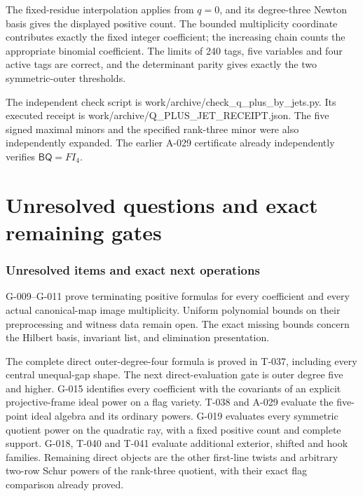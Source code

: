 \documentclass[
  10pt,
]{article}
\begin{document}
The fixed-residue interpolation applies from \(q=0\), and its
degree-three Newton basis gives the displayed positive count. The
bounded multiplicity coordinate contributes exactly the fixed integer
coefficient; the increasing chain counts the appropriate binomial
coefficient. The limits of 240 tags, five variables and four active tags
are correct, and the determinant parity gives exactly the two
symmetric-outer thresholds.

The independent check script is
work/archive/check\_q\_plus\_by\_jets.py. Its executed receipt is
work/archive/Q\_PLUS\_JET\_RECEIPT.json. The five signed maximal minors
and the specified rank-three minor were also independently expanded. The
earlier A-029 certificate already independently verifies
\(\mathsf B\mathsf Q=FI_4\).

\part{Unresolved questions and exact remaining gates}

\section{Unresolved items and exact next
operations}\label{unresolved-items-and-exact-next-operations}

G-009--G-011 prove terminating positive formulas for every coefficient
and every actual canonical-map image multiplicity. Uniform polynomial
bounds on their preprocessing and witness data remain open. The exact
missing bounds concern the Hilbert basis, invariant list, and
elimination presentation.

The complete direct outer-degree-four formula is proved in T-037,
including every central unequal-gap shape. The next direct-evaluation
gate is outer degree five and higher. G-015 identifies every coefficient
with the covariants of an explicit projective-frame ideal power on a
flag variety. T-038 and A-029 evaluate the five-point ideal algebra and
its ordinary powers. G-019 evaluates every symmetric quotient power on
the quadratic ray, with a fixed positive count and complete support.
G-018, T-040 and T-041 evaluate additional exterior, shifted and hook
families. Remaining direct objects are the other first-line twists and
arbitrary two-row Schur powers of the rank-three quotient, with their
exact flag comparison already proved.
\end{document}
